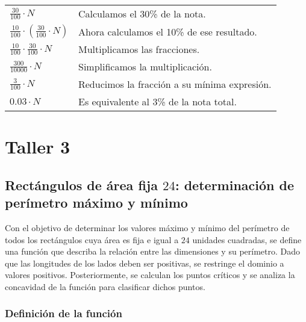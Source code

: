 \documentclass{article}
\begin{document}
\vspace{1em}
\begingroup{}
\begin{tabularx}{\textwidth}{@{}>{\raggedright\arraybackslash}p{} X@{}}
$\displaystyle \frac{30}{100} \cdot N$ &
Calculamos el 30\% de la nota. \\[2ex]

$\displaystyle \frac{10}{100} \cdot \left( \frac{30}{100} \cdot N \right)$ &
Ahora calculamos el 10\% de ese resultado. \\[2ex]

$\displaystyle \frac{10}{100} \cdot \frac{30}{100} \cdot N$ &
Multiplicamos las fracciones. \\[2ex]

$\displaystyle \frac{300}{10000} \cdot N$ &
Simplificamos la multiplicación. \\[2ex]

$\displaystyle \frac{3}{100} \cdot N$ &
Reducimos la fracción a su mínima expresión. \\[2ex]

$\displaystyle 0.03 \cdot N$ &
Es equivalente al 3\% de la nota total.\\[2ex]
\end{tabularx}
\endgroup

\section{Taller 3}
\subsection{Rectángulos de área fija $24$: determinación de perímetro máximo y mínimo}

Con el objetivo de determinar los valores máximo y mínimo del perímetro 
de todos los rectángulos cuya área es fija e igual a \(24\) unidades cuadradas, 
se define una función que describa la relación entre las dimensiones y su perímetro. 
Dado que las longitudes de los lados deben ser positivas, 
se restringe el dominio a valores positivos. 
Posteriormente, se calculan los puntos críticos y se analiza la concavidad 
de la función para clasificar dichos puntos.

\subsubsection{Definición de la función}
\end{document}
